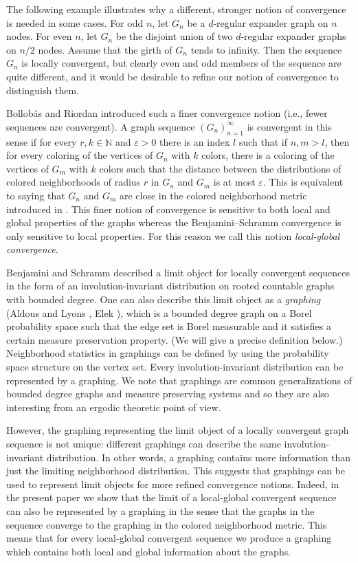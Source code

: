 \documentclass{article}
\def\eps{\varepsilon}
\begin{document}
The following example illustrates why a different, stronger notion of
convergence is needed in some cases. For odd $n$, let $G_n$ be a
$d$-regular expander graph on $n$ nodes. For even $n$, let $G_n$ be
the disjoint union of two $d$-regular expander graphs on $n/2$ nodes.
Assume that the girth of $G_n$ tends to infinity. Then the sequence
$G_n$ is locally convergent, but clearly even and odd members of the
sequence are quite different, and it would be desirable to refine our
notion of convergence to distinguish them.

Bollob\'as and Riordan \cite{BR} introduced such a finer convergence
notion (i.e., fewer sequences are convergent). A graph sequence
$(G_n)_{n=1}^\infty$ is convergent in this sense if for every
$r,k\in\mathbb{N}$ and $\eps>0$ there is an index $l$ such that if
$n,m>l$, then for every coloring of the vertices of $G_n$ with $k$
colors, there is a coloring of the vertices of $G_m$ with $k$ colors
such that the distance between the distributions of colored
neighborhoods of radius $r$ in $G_n$ and $G_m$ is at most $\eps$.
This is equivalent to saying that $G_n$ and $G_m$ are close in the
colored neighborhood metric introduced in \cite{BR}. This finer
notion of convergence is sensitive to both local and global
properties of the graphs whereas the Benjamini--Schramm convergence
is only sensitive to local properties. For this reason we call this
notion \emph{local-global convergence}.

Benjamini and Schramm described a limit object for locally convergent
sequences in the form of an involution-invariant distribution on
rooted countable graphs with bounded degree. One can also describe
this limit object as a \emph{graphing} (Aldous and Lyons
\cite{AldousLyons}, Elek \cite{Elek}), which is a bounded degree
graph on a Borel probability space such that the edge set is Borel
measurable and it satisfies a certain measure preservation property.
(We will give a precise definition below.) Neighborhood statistics in
graphings can be defined by using the probability space structure on
the vertex set. Every involution-invariant distribution can be
represented by a graphing. We note that graphings are common
generalizations of bounded degree graphs and measure preserving
systems and so they are also interesting from an ergodic theoretic
point of view.

However, the graphing representing the limit object of a locally
convergent graph sequence is not unique: different graphings can
describe the same involution-invariant distribution. In other words,
a graphing contains more information than just the limiting
neighborhood distribution. This suggests that graphings can be used
to represent limit objects for more refined convergence notions.
Indeed, in the present paper we show that the limit of a local-global
convergent sequence can also be represented by a graphing in the
sense that the graphs in the sequence converge to the graphing in the
colored neighborhood metric. This means that for every local-global
convergent sequence we produce a graphing which contains both local
and global information about the graphs.
\end{document}

